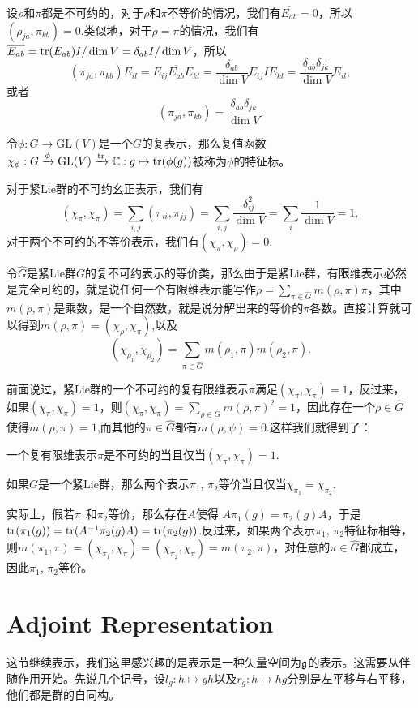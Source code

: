 \para 设$\rho$和$\pi$都是不可约的，对于$\rho$和$\pi$不等价的情况，我们有$\overline{E_{ab}}=0$，所以$\left(\rho_{ja},\pi_{kb}\right)=0$.类似地，对于$\rho=\pi$的情况，我们有$\overline{E_{ab}}=\operatorname{tr}(E_{ab})I/\dim V=\delta_{ab}I/\dim V$，所以
\[
	\left(\pi_{ja},\pi_{kb}\right)E_{il}=E_{ij}\overline{E_{ab}}E_{kl}=\frac{\delta_{ab}}{\dim V}E_{ij}IE_{kl}=\frac{\delta_{ab}\delta_{jk}}{\dim V}E_{il},
\]
或者
\[
	\left(\pi_{ja},\pi_{kb}\right)=\frac{\delta_{ab}\delta_{jk}}{\dim V}.
\]

\para 令$\phi:G\to \mathrm{GL}(V)$是一个$G$的复表示，那么复值函数$\chi_\phi:G\xrightarrow{\phi}\mathrm{GL}(V)\xrightarrow{\operatorname{tr}}\mathbb{C}:g\mapsto \operatorname{tr}(\phi(g))$被称为$\phi$的特征标。

对于紧Lie群的不可约幺正表示，我们有
\[
(\chi_\pi, \chi_\pi)=\sum_{i,j}(\pi_{ii},\pi_{jj})=\sum_{i,j}\frac{\delta_{ij}^2}{\dim V}=\sum_{i}\frac{1}{\dim V}=1,
\]
对于两个不可约的不等价表示，我们有$(\chi_\pi, \chi_\rho)=0$.

令$\hat{G}$是紧Lie群$G$的复不可约表示的等价类，那么由于是紧Lie群，有限维表示必然是完全可约的，就是说任何一个有限维表示能写作$\rho=\sum_{\pi\in\hat{G}}m(\rho,\pi)\pi$，其中$m(\rho,\pi)$是乘数，是一个自然数，就是说分解出来的等价的$\pi$各数。直接计算就可以得到$m(\rho,\pi)=(\chi_\rho,\chi_\pi)$,以及
\[
	(\chi_{\rho_1},\chi_{\rho_2})=\sum_{\pi\in\hat{G}}m(\rho_1,\pi)m(\rho_2,\pi).
\]

前面说过，紧Lie群的一个不可约的复有限维表示$\pi$满足$(\chi_\pi, \chi_\pi)=1$，反过来，如果$(\chi_\pi, \chi_\pi)=1$，则$(\chi_{\pi},\chi_{\pi})=\sum_{\rho\in\hat{G}}m(\rho,\pi)^2=1$，因此存在一个$\rho\in\hat{G}$使得$m(\rho,\pi)=1$,而其他的$\pi\in\hat{G}$都有$m(\rho,\psi)=0$.这样我们就得到了：

\para 一个复有限维表示$\pi$是不可约的当且仅当$(\chi_{\pi},\chi_{\pi})=1$.

\pro 如果$G$是一个紧Lie群，那么两个表示$\pi_1$, $\pi_2$等价当且仅当$\chi_{\pi_1}=\chi_{\pi_2}$.

实际上，假若$\pi_1$和$\pi_2$等价，那么存在$A$使得
$A\pi_1(g)=\pi_2(g)A$，于是$\operatorname{tr}(\pi_1(g))=\operatorname{tr}(A^{-1}\pi_2(g)A)=\operatorname{tr}(\pi_2(g))$.反过来，如果两个表示$\pi_1$, $\pi_2$特征标相等，则$	m(\pi_1,\pi)=(\chi_{\pi_1},\chi_\pi)=(\chi_{\pi_2},\chi_\pi)=m(\pi_2,\pi)$，对任意的$\pi\in\hat{G}$都成立，因此$\pi_1$, $\pi_2$等价。

\section{Adjoint Representation}

这节继续表示，我们这里感兴趣的是表示是一种矢量空间为${\mathfrak{g}}$的表示。这需要从伴随作用开始。先说几个记号，设$l_g:h\mapsto gh$以及$r_g:h\mapsto hg$分别是左平移与右平移，他们都是群的自同构。


